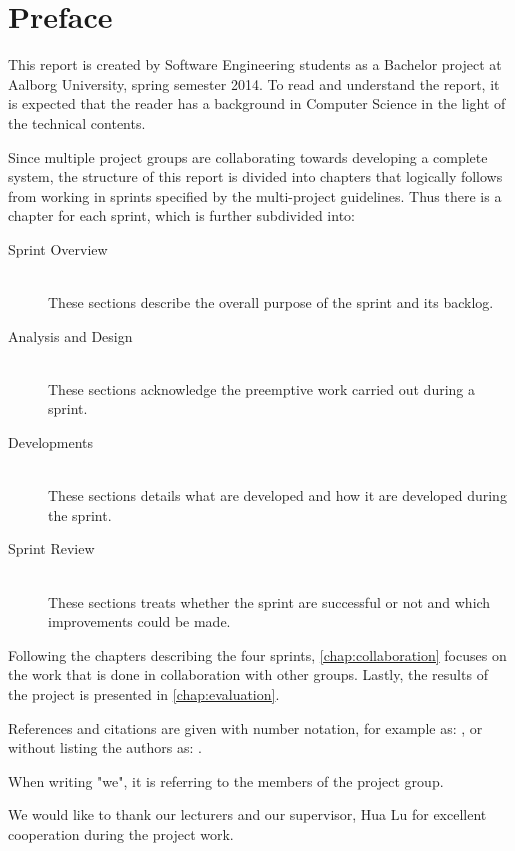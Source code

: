 \newcommand{\headerPreface}{Preface}
\cleardoublepage
{}
\pdfbookmark{\headerPreface}{chap:preface}
\chapter*{\headerPreface}\label{chap:preface}
This report is created by Software Engineering students as a Bachelor project at Aalborg University, spring semester 2014.
To read and understand the report, it is expected that the reader has a background in Computer Science in the light of the technical contents.


Since multiple project groups are collaborating towards developing a complete system, the structure of this report is divided into chapters that logically follows from working in sprints specified by the multi-project guidelines.
Thus there is a chapter for each sprint, which is further subdivided into:

\begin{description}
\item[Sprint Overview] \hfill \\
These sections describe the overall purpose of the sprint and its backlog.
\item[Analysis and Design] \hfill \\
These sections acknowledge the preemptive work carried out during a sprint.
\item[Developments] \hfill \\
These sections details what are developed and how it are developed during the sprint.
\item[Sprint Review] \hfill \\
These sections treats whether the sprint are successful or not and which improvements could be made.
\end{description}

Following the chapters describing the four sprints, \cref{chap:collaboration} focuses on the work that is done in collaboration with other groups.
Lastly, the results of the project is presented in \cref{chap:evaluation}.

References and citations are given with number notation, for example as: \citet{launcher2011}, or without listing the authors as: \cite{launcher2011}. 

When writing "we", it is referring to the members of the project group.

We would like to thank our lecturers and our supervisor, Hua Lu for excellent cooperation during the project work.
